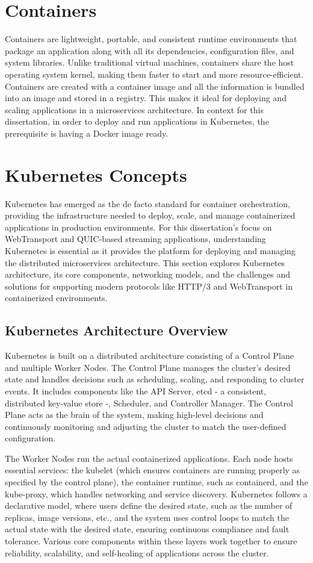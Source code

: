 \section{Containers}
Containers are lightweight, portable, and consistent runtime environments that package an application along with all its dependencies, configuration files, and system libraries. Unlike traditional virtual machines, containers share the host operating system kernel, making them faster to start and more resource-efficient. Containers are created with a container image and all the information is bundled into an image and stored in a registry. This makes it ideal for deploying and scaling applications in a microservices architecture. In context for this dissertation, in order to deploy and run applications in Kubernetes, the prerequisite is having a Docker image ready.

\section{Kubernetes Concepts}

Kubernetes has emerged as the de facto standard for container orchestration, providing the infrastructure needed to deploy, scale, and manage containerized applications in production environments. For this dissertation's focus on WebTransport and QUIC-based streaming applications, understanding Kubernetes is essential as it provides the platform for deploying and managing the distributed microservices architecture. This section explores Kubernetes architecture, its core components, networking models, and the challenges and solutions for supporting modern protocols like HTTP/3 and WebTransport in containerized environments.

\subsection{Kubernetes Architecture Overview}
Kubernetes is built on a distributed architecture consisting of a Control Plane and multiple Worker Nodes. The Control Plane manages the cluster's desired state and handles decisions such as scheduling, scaling, and responding to cluster events. It includes components like the API Server, etcd - a consistent, distributed key-value store -, Scheduler, and Controller Manager. The Control Plane acts as the brain of the system, making high-level decisions and continuously monitoring and adjusting the cluster to match the user-defined configuration.

The Worker Nodes run the actual containerized applications. Each node hosts essential services: the kubelet (which ensures containers are running properly as specified by the control plane), the container runtime, such as containerd, and the kube-proxy, which handles networking and service discovery. Kubernetes follows a declarative model, where users define the desired state, such as the number of replicas, image versions, etc., and the system uses control loops to match the actual state with the desired state, ensuring continuous compliance and fault tolerance. Various core components within these layers work together to ensure reliability, scalability, and self-healing of applications across the cluster.

